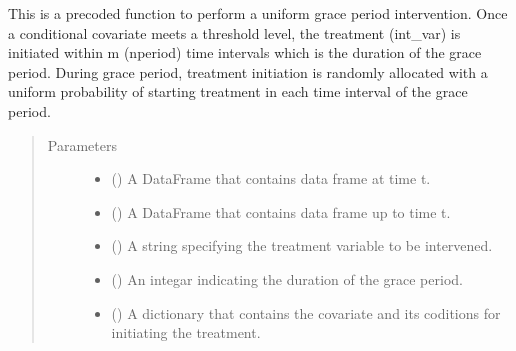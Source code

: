 \documentclass[letterpaper,10pt,english]{sphinxmanual}
\begin{document}
\begin{fulllineitems}
\label{\detokenize{Specifications/Intervention:pygformula.parametric_gformula.interventions.uniform_grace_period}}
\sphinxAtStartPar
This is a pre\sphinxhyphen{}coded function to perform a uniform grace period intervention. Once a conditional covariate
meets a threshold level, the treatment (int\_var) is initiated within m (nperiod) time intervals which is the duration
of the grace period. During grace period, treatment initiation is randomly allocated with a uniform probability of
starting treatment in each time interval of the grace period.
\begin{quote}\begin{description}
\item[{Parameters}] \leavevmode\begin{itemize}
\item {} 
\sphinxAtStartPar
{} () \textendash{} A DataFrame that contains data frame at time t.

\item {} 
\sphinxAtStartPar
{} () \textendash{} A DataFrame that contains data frame up to time t.

\item {} 
\sphinxAtStartPar
{} () \textendash{} A string specifying the treatment variable to be intervened.

\item {} 
\sphinxAtStartPar
{} () \textendash{} An integar indicating the duration of the grace period.

\item {} 
\sphinxAtStartPar
{} () \textendash{} A dictionary that contains the covariate and its coditions for initiating the treatment.


\end{itemize}
\end{description}
\end{quote}
\end{fulllineitems}
\end{document}
